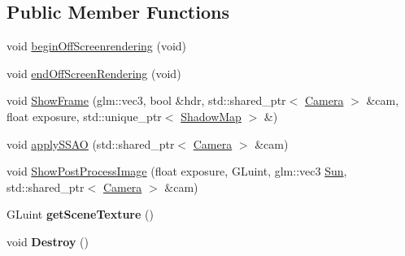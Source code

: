 \subsection*{Public Member Functions}
\begin{DoxyCompactItemize}
\item 
void \hyperlink{class_post_process_a38bb7420926e3eabf5f4f73ecff37aa9}{begin\+Off\+Screenrendering} (void)
\item 
void \hyperlink{class_post_process_a19cbfd261c0899f70035134e56ec0faa}{end\+Off\+Screen\+Rendering} (void)
\item 
void \hyperlink{class_post_process_acebaecb02b654eef8775ed01d7ac792d}{Show\+Frame} (glm\+::vec3, bool \&hdr, std\+::shared\+\_\+ptr$<$ \hyperlink{class_camera}{Camera} $>$ \&cam, float exposure, std\+::unique\+\_\+ptr$<$ \hyperlink{class_shadow_map}{Shadow\+Map} $>$ \&)
\item 
void \hyperlink{class_post_process_a91ba3f5417ef7302414ef22511542fb8}{apply\+S\+S\+AO} (std\+::shared\+\_\+ptr$<$ \hyperlink{class_camera}{Camera} $>$ \&cam)
\item 
void \hyperlink{class_post_process_a78f0a745809aa98913eeae01c00cfe68}{Show\+Post\+Process\+Image} (float exposure, G\+Luint, glm\+::vec3 \hyperlink{class_sun}{Sun}, std\+::shared\+\_\+ptr$<$ \hyperlink{class_camera}{Camera} $>$ \&cam)
\item 
G\+Luint {\bfseries get\+Scene\+Texture} ()\hypertarget{class_post_process_aca5a2fb8f56f160dc447e3f1a8406083}{}\label{class_post_process_aca5a2fb8f56f160dc447e3f1a8406083}

\item 
void {\bfseries Destroy} ()\hypertarget{class_post_process_a347f369fe253926301925a2628bdb9d2}{}\label{class_post_process_a347f369fe253926301925a2628bdb9d2}

\end{DoxyCompactItemize}
